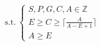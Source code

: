 \documentclass[preview]{standalone}
\begin{document}
\begin{align*}
\text{s.t.}~\begin{cases}S, P, G, C, A \in \mathbb{Z} \\E \geq C \geq \lceil \frac{A}{A - E + 1} \rceil \\ A \geq E\end{cases}
\end{align*}
\end{document}
